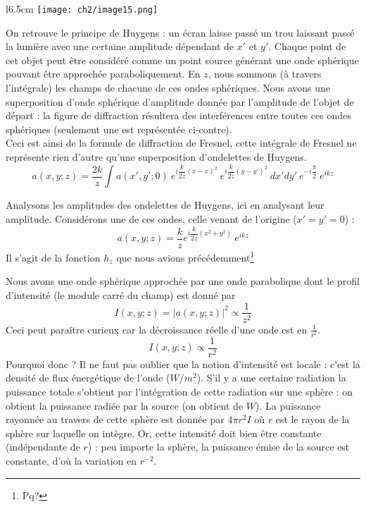 \begin{wrapfigure}[9]{l}{6.5cm}
\vspace{-5mm}
\texttt{[image: ch2/image15.png]}
\end{wrapfigure}
On retrouve le 
principe de Huygens : un écran laisse passé un trou laissant passé la lumière avec une certaine 
amplitude dépendant de $x'$ et $y'$. Chaque point de cet objet peut être considéré comme un point 
source générant une onde sphérique pouvant être approchée paraboliquement. En $z$, nous sommons 
(à travers l'intégrale) les champs de chacune de ces ondes sphériques. Nous avons une 
superposition d'onde sphérique d'amplitude donnée par l'amplitude de l'objet de départ : la 
figure de diffraction résultera des interférences entre toutes ces ondes sphériques (seulement une 
est représentée ci-contre).\\

Ceci est ainsi de la formule de diffraction de Fresnel, cette intégrale de Fresnel ne représente 
rien d'autre qu'une superposition d'ondelettes de Huygens.
\begin{equation}
a(x,y;z) = \frac{2k}{z}\int a(x',y';0)\ e^{i\dfrac{k}{2z}(x-x)^2}\
 e^{i\dfrac{k}{2z}(y-y')^2}\ dx'dy'\ e^{-i\dfrac{\pi}{2}}\ e^{ikz}
\end{equation}


Analysons les amplitudes des ondelettes de Huygens, ici en analysant leur amplitude. Considérons 
une de ces ondes, celle venant de l'origine ($x'=y'=0$) :
\begin{equation}
a(x,y;z) = \dfrac{k}{z}e^{i\dfrac{k}{2z}(x^2+y^2)}\ e^{ikz}
\end{equation}
Il s'agit de la fonction $h_z$ que nous avions précédemment\footnote{Pq?}



Nous avons une onde sphérique approchée par une onde parabolique dont le profil d'intensité 
(le module carré du champ) est donné par
\begin{equation}
I(x,y;z) = |a(x,y;z)|^2 \propto \dfrac{1}{z^2}
\end{equation}
Ceci peut paraître curieux car la décroissance réelle d'une onde est en $\frac{1}{r^2}$.
\begin{equation}
I(x,y;z) \propto \frac{1}{r^2}
\end{equation}
Pourquoi donc ? Il ne faut pas oublier que la notion d'intensité est locale : c'est la 
densité de flux énergétique de l'onde ($W/m^2$). S'il y a une certaine radiation la puissance 
totale s'obtient par l'intégration de cette radiation sur une sphère : on obtient la 
puissance radiée par la source (on obtient de $W$). La puissance rayonnée au travers de cette 
sphère est donnée par $4\pi r^2 I$ où $r$ est le rayon de la sphère sur laquelle on intègre. 
Or, cette intensité doit bien être constante (indépendante de $r$) : peu importe la sphère, 
la puissance émise de la source est constante, d'où la variation en $r^{-2}$.\\

